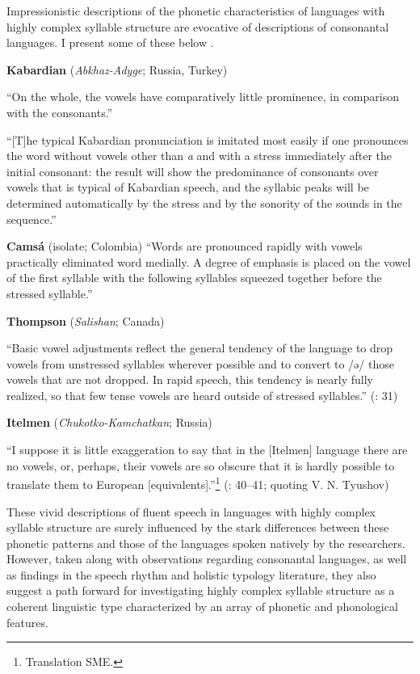 Impressionistic descriptions of the phonetic characteristics of languages with highly complex syllable structure are evocative of descriptions of consonantal languages. I present some of these below .

\ea\label{ex:1.19}
  \textbf{Kabardian} (\textit{Abkhaz-Adyge}; Russia, Turkey)

“On the whole, the vowels have comparatively little prominence, in comparison with the consonants.”
\citep[24]{Kuipers1960}

“[T]he typical Kabardian pronunciation is imitated most easily if one pronounces the word without vowels other than \textit{a} and with a stress immediately after the initial consonant: the result will show the predominance of consonants over vowels that is typical of Kabardian speech, and the syllabic peaks will be determined automatically by the stress and by the sonority of the sounds in the sequence.” 
\citep[43]{Kuipers1960}
\z

\ea\label{ex:1.20}
  \textbf{Camsá} (isolate; Colombia)
“Words are pronounced rapidly with vowels practically eliminated word medially. A degree of emphasis is placed on the vowel of the first syllable with the following syllables squeezed together before the stressed syllable.” 
\citep[86--87]{Howard1967}
\z

\ea\label{ex:1.21}
  \textbf{Thompson} (\textit{Salishan}; Canada)

“Basic vowel adjustments reflect the general tendency of the language to drop vowels from unstressed syllables wherever possible and to convert to /ə/ those vowels that are not dropped. In rapid speech, this tendency is nearly fully realized, so that few tense vowels are heard outside of stressed syllables.” 
(\citealt{ThompsonThompson1992}: 31)
\z

\ea\label{ex:1.22}
  \textbf{Itelmen} (\textit{Chukotko-Kamchatkan}; Russia)

“I suppose it is little exaggeration to say that in the [Itelmen] language there are no vowels, or, perhaps, their vowels are so obscure that it is hardly possible to translate them to European [equivalents].”\footnote{{Translation SME.}} 
(\citealt{Volodin1976}: 40--41; quoting V. N. Tyushov)
\z

  These vivid descriptions of fluent speech in languages with highly complex syllable structure are surely influenced by the stark differences between these phonetic patterns and those of the languages spoken natively by the researchers. However, taken along with observations regarding consonantal languages, as well as findings in the speech rhythm and holistic typology literature, they also suggest a path forward for investigating highly complex syllable structure as a coherent linguistic type characterized by an array of phonetic and phonological features.

